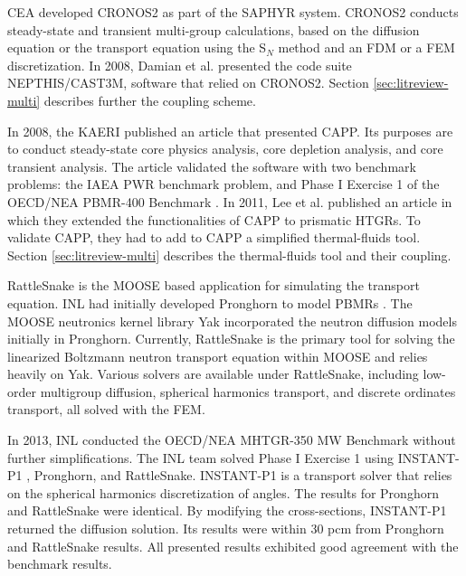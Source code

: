 \gls{CEA} developed CRONOS2 \cite{lautard_cronos_1990} as part of the SAPHYR system.
CRONOS2 conducts steady-state and transient multi-group calculations, based on the diffusion equation or the transport equation using the S$_N$ method and an \gls{FDM} or a \gls{FEM} discretization.
In 2008, Damian et al. \cite{damian_vhtr_2008} presented the code suite NEPTHIS\cite{cavalier_presentation_2005}/CAST3M\cite{studer_cast3marcturus_2007}, software that relied on CRONOS2.
Section \ref{sec:litreview-multi} describes further the coupling scheme.

In 2008, the \gls{KAERI} published an article \cite{lee_development_2008} that presented CAPP.
Its purposes are to conduct steady-state core physics analysis, core depletion analysis, and core transient analysis.
The article validated the software with two benchmark problems: the IAEA PWR benchmark problem, and Phase I Exercise 1 of the OECD/NEA PBMR-400 Benchmark \cite{reitsma_oecd-neansc_2008}.
In 2011, Lee et al. published an article \cite{lee_development_2011} in which they extended the functionalities of CAPP to prismatic HTGRs.
To validate CAPP, they had to add to CAPP a simplified thermal-fluids tool.
Section \ref{sec:litreview-multi} describes the thermal-fluids tool and their coupling.

RattleSnake \cite{wang_rattlesnake_2019} is the MOOSE \cite{gaston_moose_2009} based application for simulating the transport equation.
\gls{INL} had initially developed Pronghorn \cite{novak_pronghorn_2018} to model \glspl{PBMR} \cite{strydom_inl_2013}.
The MOOSE neutronics kernel library Yak incorporated the neutron diffusion models initially in Pronghorn.
Currently, RattleSnake is the primary tool for solving the linearized Boltzmann neutron transport equation within MOOSE and relies heavily on Yak.
Various solvers are available under RattleSnake, including low-order multigroup diffusion, spherical harmonics transport, and discrete ordinates transport, all solved with the \gls{FEM}.

In 2013, \gls{INL} conducted the OECD/NEA MHTGR-350 MW Benchmark \cite{oecd_nea_benchmark_2017}\cite{strydom_inl_2013} without further simplifications.
The \gls{INL} team solved Phase I Exercise 1 using INSTANT-P1 \cite{wang_krylov_2011}, Pronghorn, and RattleSnake.
INSTANT-P1 is a transport solver that relies on the spherical harmonics discretization of angles.
The results for Pronghorn and RattleSnake were identical.
By modifying the cross-sections, INSTANT-P1 returned the diffusion solution.
Its results were within 30 pcm from Pronghorn and RattleSnake results.
All presented results exhibited good agreement with the benchmark results.

